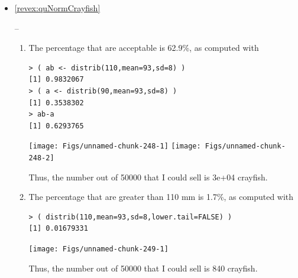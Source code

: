 \documentclass[10pt,openany]{book}\usepackage[]{graphicx}\usepackage[]{color}
\makeatletter
\newenvironment{kframe}{%
 \def\at@end@of@kframe{}%
 \ifinner\ifhmode%
  \def\at@end@of@kframe{\end{minipage}}%
  \begin{minipage}{\columnwidth}%
 \fi\fi%
 \def\FrameCommand##1{\hskip\@totalleftmargin \hskip-\fboxsep
 \colorbox{shadecolor}{##1}\hskip-\fboxsep
     \hskip-\linewidth \hskip-\@totalleftmargin \hskip\columnwidth}%
 \MakeFramed {\advance\hsize-\width
   \@totalleftmargin\z@ \linewidth\hsize
   \@setminipage}}%
 {\par\unskip\endMakeFramed%
 \at@end@of@kframe}
\newenvironment{knitrout}{}{} %
\makeatother
\begin{document}
\begin{itemize}
\begin{enumerate}
\begin{knitrout}
\end{knitrout}
    \end{enumerate}

  \item \hypertarget{ans:quNormCrayfish}{\ref{revex:quNormCrayfish}} --
    \begin{enumerate}
      \item The percentage that are acceptable is 62.9\%, as computed with
\begin{knitrout}
\color{fgcolor}\begin{kframe}
\begin{verbatim}
> ( ab <- distrib(110,mean=93,sd=8) )
[1] 0.9832067
> ( a <- distrib(90,mean=93,sd=8) )
[1] 0.3538302
> ab-a
[1] 0.6293765
\end{verbatim}
\end{kframe}

{\centering \texttt{[image: Figs/unnamed-chunk-248-1]} 
\texttt{[image: Figs/unnamed-chunk-248-2]} 

}



\end{knitrout}
Thus, the number out of 50000 that I could sell is 3e+04 crayfish.
      \item The percentage that are greater than 110 mm is 1.7\%, as computed with
\begin{knitrout}
\color{fgcolor}\begin{kframe}
\begin{verbatim}
> ( distrib(110,mean=93,sd=8,lower.tail=FALSE) )
[1] 0.01679331
\end{verbatim}
\end{kframe}

{\centering \texttt{[image: Figs/unnamed-chunk-249-1]} 

}



\end{knitrout}
Thus, the number out of 50000 that I could sell is 840 crayfish.
    \end{enumerate}

\end{itemize}




\end{document}
